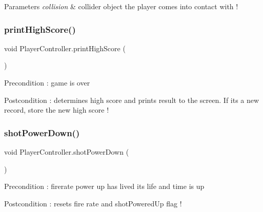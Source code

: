 \begin{DoxyParams}{Parameters}
{\em collision} & collider object the player comes into contact with ! \\
\hline
\end{DoxyParams}
\mbox{\label{class_player_controller_a685b3e7478ec3431f858455832c45527}} 
\subsubsection{\texorpdfstring{printHighScore()}{printHighScore()}}
{\footnotesize\ttfamily void Player\+Controller.\+print\+High\+Score (\begin{DoxyParamCaption}{ }\end{DoxyParamCaption})}

\begin{DoxyPrecond}{Precondition}
\+: game is over 
\end{DoxyPrecond}
\begin{DoxyPostcond}{Postcondition}
\+: determines high score and prints result to the screen. If it\textquotesingle{}s a new record, store the new high score ! 
\end{DoxyPostcond}
\mbox{\label{class_player_controller_a5d6e6be056b9cc9f2db7195e633bdd4c}} 
\subsubsection{\texorpdfstring{shotPowerDown()}{shotPowerDown()}}
{\footnotesize\ttfamily void Player\+Controller.\+shot\+Power\+Down (\begin{DoxyParamCaption}{ }\end{DoxyParamCaption})}

\begin{DoxyPrecond}{Precondition}
\+: firerate power up has lived its life and time is up 
\end{DoxyPrecond}
\begin{DoxyPostcond}{Postcondition}
\+: resets fire rate and shot\+Powered\+Up flag ! 
\end{DoxyPostcond}
\mbox{\label{class_player_controller_acbd4651a9689e6e27538e149b0e3f2a9}} 
